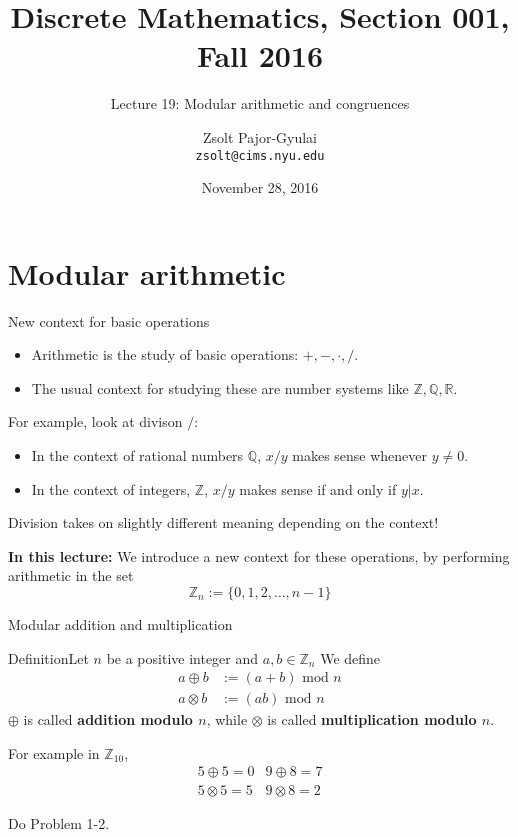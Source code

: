 \documentclass{beamer}
\title{Discrete Mathematics, Section 001, Fall 2016}
\subtitle{Lecture 19: Modular arithmetic and congruences}
\date{November 28, 2016}
\author[Zsolt]{Zsolt Pajor-Gyulai \\ \texttt{zsolt@cims.nyu.edu}}
\institute[NYU] 
{
\normalsize Courant Institute of Mathematical Sciences
}
\def\bl[#1]#2{\begin{block}{#1}#2\end{block}}
\def\itemb{\begin{itemize}}
\def\iteme{\end{itemize}}
\begin{document}
\begin{frame}
  \titlepage
\end{frame}


\section{Modular arithmetic}

\begin{frame}{New context for basic operations}
\itemb
\item Arithmetic is the study of basic operations: $+,-,\cdot,/$.
\item The usual context for studying these are number systems like $\mathbb{Z},\mathbb{Q},\mathbb{R}$.
\iteme
For example, look at divison $/$:
\itemb
\item In the context of rational numbers $\mathbb{Q}$, $x/y$ makes sense whenever $y\neq 0$.
\item In the context of integers, $\mathbb{Z}$, $x/y$ makes sense if and only if $y|x$.
\iteme
\begin{center}
Division takes on slightly different meaning depending on the context!
\end{center}

\textbf{In this lecture:} We introduce a new context for these operations, by performing arithmetic in the set
\[
\mathbb{Z}_n:=\{0,1,2,\dots,n-1\}
\]
\end{frame}

\begin{frame}{Modular addition and multiplication}
\bl[Definition]{Let $n$ be a positive integer and $a,b\in\mathbb{Z}_n$  We define
\begin{align*}
a\oplus b&:=(a+b)\textrm{ mod }n\\
a\otimes b&:= (ab)\textrm{ mod }n
\end{align*}
$\oplus$ is called \textbf{addition modulo $n$}, while $\otimes$ is called \textbf{multiplication modulo $n$}.}


For example in $\mathbb{Z}_{10}$,
\[
\begin{array}{cc}
5\oplus 5=0&9\oplus 8=7\\
5\otimes 5=5&9\otimes 8=2
\end{array}
\]

\center Do Problem 1-2.
\end{frame}
\end{document}
